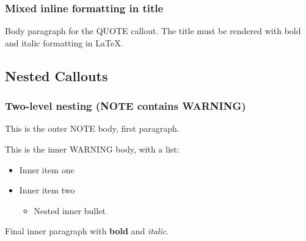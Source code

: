 \subsubsection{Mixed inline formatting in
title}\label{mixed-inline-formatting-in-title}

\begin{tcolorbox}[breakable,colback=gray!5!white,colframe=gray!60!black,left=3mm,boxed title style={left=1mm},title={\hspace*{-2.5mm}\iconQuote\; A \textbf{Markdown} \emph{formatted} title}]

Body paragraph for the QUOTE callout. The title must be rendered with
bold and italic formatting in LaTeX.

\end{tcolorbox}

\subsection{Nested Callouts}\label{nested-callouts}

\subsubsection{Two-level nesting (NOTE contains
WARNING)}\label{two-level-nesting-note-contains-warning}

\begin{tcolorbox}[breakable,colback=ocGryBack,colframe=ocGryFrame,coltitle=ocGryTitle,left=3mm,boxed title style={left=1mm},title={\hspace*{-2.5mm}\iconNote\; Outer NOTE title}]

This is the outer NOTE body, first paragraph.

\begin{tcolorbox}[breakable,colback=ocOrgBack,colframe=ocOrgFrame,coltitle=ocOrgTitle,left=3mm,boxed title style={left=1mm},title={\hspace*{-2.5mm}\iconWarning\; Inner WARNING title}]

This is the inner WARNING body, with a list:

\begin{itemize}
\tightlist
\item
  Inner item one
\item
  Inner item two

  \begin{itemize}
  \tightlist
  \item
    Nested inner bullet
  \end{itemize}
\end{itemize}

Final inner paragraph with \textbf{bold} and \emph{italic}.

\end{tcolorbox}

\end{tcolorbox}

